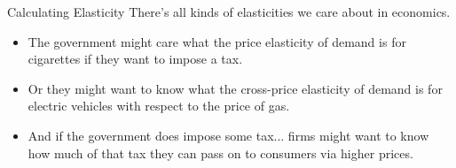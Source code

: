 \documentclass[12pt,t]{beamer}
\begin{document}
\begin{frame}{Calculating Elasticity}
  There's all kinds of elasticities we care about in economics. 

  \begin{itemize}
    \item The government might care what the price elasticity of demand is for cigarettes if they want to impose a tax.

    \item Or they might want to know what the cross-price elasticity of demand is for electric vehicles with respect to the price of gas.

    \item And if the government does impose some tax... firms might want to know how much of that tax they can pass on to consumers via higher prices.
  \end{itemize}
\end{frame}
\end{document}
